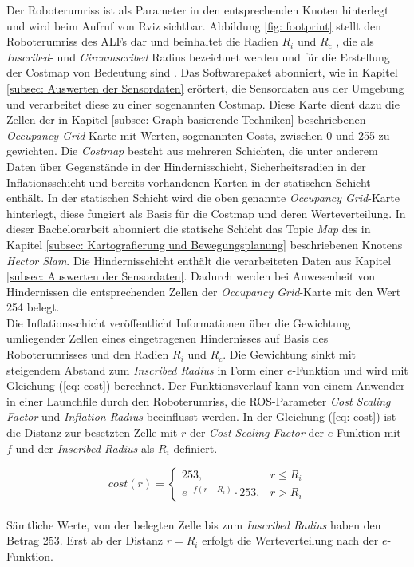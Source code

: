 		     Der Roboterumriss ist als Parameter in den entsprechenden Knoten hinterlegt und wird beim Aufruf von Rviz sichtbar. Abbildung \ref{fig: footprint} stellt den Roboterumriss des ALFs dar und beinhaltet die Radien $R_{i}$ und $R_{c}$ , die als \textit{Inscribed}- und \textit{Circumscribed} Radius bezeichnet werden und für die Erstellung der Costmap von Bedeutung sind \cite{costmap}. Das Softwarepaket abonniert, wie in Kapitel \ref{subsec: Auswerten der Sensordaten} erörtert, die Sensordaten aus der Umgebung und verarbeitet diese zu einer sogenannten Costmap. Diese Karte dient dazu die Zellen der in Kapitel \ref{subsec: Graph-basierende Techniken} beschriebenen \textit{Occupancy Grid}-Karte mit Werten, sogenannten Costs, zwischen 0 und 255 zu gewichten.
		  	Die \textit{Costmap} besteht aus mehreren Schichten, die unter anderem Daten über Gegenstände in der Hindernisschicht, Sicherheitsradien in der Inflationsschicht und bereits vorhandenen Karten in der statischen Schicht enthält. In der statischen Schicht wird die oben genannte \textit{Occupancy Grid}-Karte hinterlegt, diese fungiert als Basis für die Costmap und deren Werteverteilung. In dieser Bachelorarbeit abonniert die statische Schicht das Topic \textit{Map} des in Kapitel \ref{subsec: Kartografierung und Bewegungsplanung} beschriebenen Knotens \textit{Hector Slam}.
		  	Die Hindernisschicht enthält die verarbeiteten Daten aus Kapitel \ref{subsec: Auswerten der Sensordaten}. Dadurch werden bei Anwesenheit von Hindernissen die entsprechenden Zellen der \textit{Occupancy Grid}-Karte mit den Wert 254 belegt. \cite{costmap}\\
		  	
		  	Die Inflationsschicht veröffentlicht Informationen über die Gewichtung umliegender Zellen eines eingetragenen Hindernisses auf Basis des Roboterumrisses und den Radien $R_{i}$ und $R_{c}$. 
		  	Die Gewichtung sinkt mit steigendem Abstand zum \textit{Inscribed Radius} in Form einer $e$-Funktion und wird mit Gleichung (\ref{eq: cost}) berechnet. Der Funktionsverlauf kann von einem Anwender in einer Launchfile durch den Roboterumriss, die ROS-Parameter \textit{Cost Scaling Factor} und  \textit{Inflation Radius} beeinflusst werden.
		  	In der Gleichung (\ref{eq: cost}) ist die Distanz zur besetzten Zelle mit $r$ der \textit{Cost Scaling Factor} der $e$-Funktion mit $f$ und der \textit{Inscribed Radius} als $R_{i}$ definiert. \cite{costmap,inflation}
		  		
		  		\begin{equation}
		  		cost(r)=\left\{\begin{array}{ll} 253, & r\le R_{i}  \\
		  		e^{-f (r - R_{i})} \cdot 253, & r> R_{i}\end{array}\right.
		  		\label{eq: cost}
		  		\end{equation}\\		  	
		  	Sämtliche Werte, von der belegten Zelle bis zum \textit{Inscribed Radius} haben den Betrag 253. Erst ab der Distanz $r=R_{i}$ erfolgt die Werteverteilung nach der $e$-Funktion.
		  		
